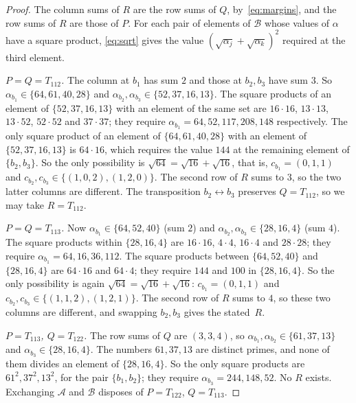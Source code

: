 \documentclass[11pt,a4paper]{amsart}
\theoremstyle{definition}
\theoremstyle{remark}
\newcommand{\cA}{\mathcal{A}}
\newcommand{\cB}{\mathcal{B}}
\begin{document}
\begin{proof}
The column sums of $R$ are the row sums of $Q$, by~\eqref{eq:margins}, and the row sums of $R$ are those of
$P$. For each pair of elements of $\cB$ whose values of $\alpha$ have a square product, \eqref{eq:sqrt} gives
the value $(\sqrt{\alpha_j}+\sqrt{\alpha_k})^2$ required at the third element.

\emph{$P=Q=T_{112}$.} The column at $b_1$ has sum $2$ and those at $b_2,b_3$ have sum $3$. So
$\alpha_{b_1}\in\{64,61,40,28\}$ and $\alpha_{b_2},\alpha_{b_3}\in\{52,37,16,13\}$. The square products of an
element of $\{52,37,16,13\}$ with an element of the same set are $16\cdot16$, $13\cdot13$, $13\cdot52$,
$52\cdot52$ and $37\cdot37$; they require $\alpha_{b_1}=64,52,117,208,148$ respectively. The only square
product of an element of $\{64,61,40,28\}$ with an element of $\{52,37,16,13\}$ is $64\cdot16$, which
requires the value $144$ at the remaining element of $\{b_2,b_3\}$. So the only possibility is
$\sqrt{64}=\sqrt{16}+\sqrt{16}$, that is, $c_{b_1}=(0,1,1)$ and $c_{b_2},c_{b_3}\in\{(1,0,2),(1,2,0)\}$. The second
row of $R$ sums to $3$, so the two latter columns are different. The transposition $b_2\leftrightarrow b_3$
preserves $Q=T_{112}$, so we may take $R=T_{112}$.

\emph{$P=Q=T_{113}$.} Now $\alpha_{b_1}\in\{64,52,40\}$ (sum $2$) and $\alpha_{b_2},\alpha_{b_3}\in\{28,16,4\}$
(sum $4$). The square products within $\{28,16,4\}$ are $16\cdot16$, $4\cdot4$, $16\cdot4$ and $28\cdot28$;
they require $\alpha_{b_1}=64,16,36,112$. The square products between $\{64,52,40\}$ and $\{28,16,4\}$ are
$64\cdot16$ and $64\cdot4$; they require $144$ and $100$ in $\{28,16,4\}$. So the only possibility is again
$\sqrt{64}=\sqrt{16}+\sqrt{16}$: $c_{b_1}=(0,1,1)$ and $c_{b_2},c_{b_3}\in\{(1,1,2),(1,2,1)\}$. The second row of $R$
sums to $4$, so these two columns are different, and swapping $b_2,b_3$ gives the stated~$R$.

\emph{$P=T_{113}$, $Q=T_{122}$.} The row sums of $Q$ are $(3,3,4)$, so $\alpha_{b_1},\alpha_{b_2}\in\{61,37,13\}$
and $\alpha_{b_3}\in\{28,16,4\}$. The numbers $61,37,13$ are distinct primes, and none of them divides an
element of $\{28,16,4\}$. So the only square products are $61^2,37^2,13^2$, for the pair $\{b_1,b_2\}$; they
require $\alpha_{b_3}=244,148,52$. No $R$ exists. Exchanging $\cA$ and $\cB$ disposes of $P=T_{122}$,
$Q=T_{113}$.


\end{proof}
\end{document}
